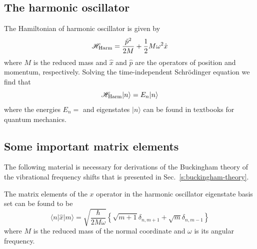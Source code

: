 \documentclass[a4paper,titlepage,twoside,fleqn,12pt]{book}
\begin{document}
\begin{appendices}
\section{The harmonic oscillator\label{a:harmonic-oscillator}}

The Hamiltonian of harmonic oscillator is given by
%
\begin{equation}\label{e:h_harm-appendix}
\mathscr{H}_{\rm Harm} = 
\frac{\hat{p}^2}{2M} + \frac{1}{2} M \omega^2 \hat{x}
\end{equation}
%
where $M$ is the reduced mass and $\hat{x}$ and $\hat{p}$ are the operators
of position and momentum, respectively. Solving the time\hyp{}independent 
Schr{\"o}dinger equation we find that 
%
\begin{equation}\label{e:h_harm-appendix-schreq}
\mathscr{H}_{\rm Harm} \vert n \rangle = 
E_n \vert n \rangle 
\end{equation}
%
where the energies $E_n=$ and eigenstates $\vert n \rangle$ can be found
in textbooks for quantum mechanics.

\subsection{Some important matrix elements\label{a:matrix-elements}}

The following material is necessary for derivations of the Buckingham theory
of the vibrational frequency shifts that is presented in Sec.~\ref{s:buckingham-theory}. 

The matrix elements of the $x$ operator in the harmonic oscillator eigenstate basis set
can be found to be
%
\begin{equation}
\label{ea:mxn}
\langle n \vert \hat{x} \vert m \rangle = 
\sqrt{
\frac{\hbar}{2M\omega}
}
\left\{ 
   \sqrt{m+1} \delta_{n,m+1} + \sqrt{m} \delta_{n,m-1}
\right\}
\end{equation}
%
\noindent where $M$ is the reduced mass of the normal coordinate and $\omega$ is its 
angular frequency.


\end{appendices}
\end{document}
